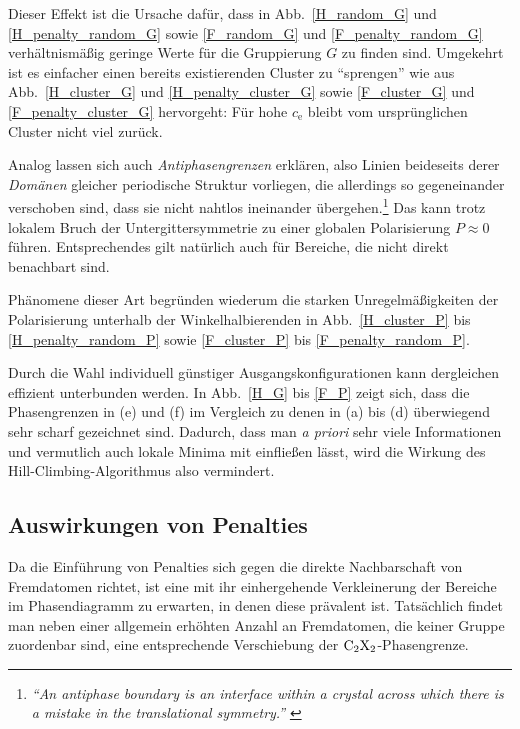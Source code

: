 \documentclass[a4paper, 10pt, twoside, openany]{book} %
\def \cE {c_\mathrm{e}}
\begin{document}
	Dieser Effekt ist die Ursache dafür, dass in Abb.~\ref{H_random_G} und \ref{H_penalty_random_G} sowie \ref{F_random_G} und \ref{F_penalty_random_G} verhältnismäßig geringe Werte für die Gruppierung $G$ zu finden sind. Umgekehrt ist es einfacher einen bereits existierenden Cluster zu "`sprengen"' wie aus Abb.~\ref{H_cluster_G} und \ref{H_penalty_cluster_G} sowie \ref{F_cluster_G} und \ref{F_penalty_cluster_G} hervorgeht: Für hohe $\cE$ bleibt vom ursprünglichen Cluster nicht viel zurück.
	
	Analog lassen sich auch \emph{Antiphasengrenzen} erklären, also Linien beideseits derer \emph{Domänen} gleicher periodische Struktur vorliegen, die allerdings so gegeneinander verschoben sind, dass sie nicht nahtlos ineinander übergehen.\footnote{\emph{"`An antiphase boundary is an interface within a crystal across which there is a mistake in the translational symmetry."'} \cite[S. 218f]{Putnis}} Das kann trotz lokalem Bruch der Untergittersymmetrie zu einer globalen Polarisierung $P \approx 0$ führen. Entsprechendes gilt natürlich auch für Bereiche, die nicht direkt benachbart sind.
	
	Phänomene dieser Art begründen wiederum die starken Unregelmäßigkeiten der Polarisierung unterhalb der Winkelhalbierenden in Abb.~\ref{H_cluster_P} bis \ref{H_penalty_random_P} sowie \ref{F_cluster_P} bis \ref{F_penalty_random_P}.
	
	Durch die Wahl individuell günstiger Ausgangskonfigurationen kann dergleichen effizient unterbunden werden. In Abb.~\ref{H_G} bis \ref{F_P} zeigt sich, dass die Phasengrenzen in (e) und (f) im Vergleich zu denen in (a) bis (d) überwiegend sehr scharf gezeichnet sind. Dadurch, dass man \emph{a priori} sehr viele Informationen und vermutlich auch lokale Minima mit einfließen lässt, wird die Wirkung des Hill-Climbing-Algorithmus also vermindert.
	
	\subsection{Auswirkungen von Penalties}
	
	Da die Einführung von Penalties sich gegen die direkte Nachbarschaft von Fremdatomen richtet, ist eine mit ihr einhergehende Verkleinerung der Bereiche im Phasendiagramm zu erwarten, in denen diese prävalent ist. Tatsächlich findet man neben einer allgemein erhöhten Anzahl an Fremdatomen, die keiner Gruppe zuordenbar sind, eine entsprechende Verschiebung der $\rm C_2X_2$-Phasengrenze.
	
\end{document}
